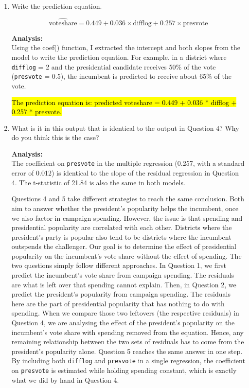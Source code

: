 \documentclass[12pt,letterpaper]{article}
\begin{document}
\begin{enumerate}
		\item Write the prediction equation.
		
		
		\[ \widehat{\text{voteshare}} = 0.449 + 0.036 \times \text{difflog} + 0.257 \times \text{presvote} \]
		
		\textbf{Analysis:}\\
		Using the coef() function, I extracted the intercept and both slopes from the model to write the prediction equation. For example, in a district where \texttt{difflog} = 2 and the presidential candidate receives 50\% of the vote (\texttt{presvote} = 0.5), the incumbent is predicted to receive about 65\% of the vote.
		
		\hl{The prediction equation is: predicted voteshare = 0.449 + 0.036 * difflog + 0.257 * presvote.}
		
		\item What is it in this output that is identical to the output in Question 4? Why do you think this is the case?
		
		\textbf{Analysis:}\\
		The coefficient on \texttt{presvote} in the multiple regression (0.257, with a standard error of 0.012) is identical to the slope of the residual regression in Question 4. The t-statistic of 21.84 is also the same in both models.
		
		Questions 4 and 5 take different strategies to reach the same conclusion. Both aim to answer whether the president's popularity helps the incumbent, once we also factor in campaign spending. However, the issue is that spending and presidential popularity are correlated with each other. Districts where the president's party is popular also tend to be districts where the incumbent outspends the challenger. Our goal is to determine the effect of presidential popularity on the incumbent's vote share without the effect of spending. The two questions simply follow different approaches. In Question 1, we first predict the incumbent's vote share from campaign spending. The residuals are what is left over that spending cannot explain. Then, in Question 2, we predict the president's popularity from campaign spending. The residuals here are the part of presidential popularity that has nothing to do with spending. When we compare those two leftovers (the respective residuals) in Question 4, we are analysing the effect of the president's popularity on the incumbent's vote share with spending removed from the equation. Hence, any remaining relationship between the two sets of residuals has to come from the president's popularity alone. Question 5 reaches the same answer in one step. By including both \texttt{difflog} and \texttt{presvote} in a single regression, the coefficient on \texttt{presvote} is estimated while holding spending constant, which is exactly what we did by hand in Question 4. 
		

\end{enumerate}
\end{document}
